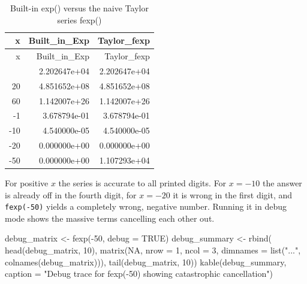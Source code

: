 \documentclass[
  letterpaper,
  DIV=11,
  numbers=noendperiod]{scrreprt}
\newenvironment{Shaded}{\begin{snugshade}}{\end{snugshade}}
\newcommand{\AttributeTok}[1]{\textcolor[rgb]{0.40,0.45,0.13}{#1}}
\newcommand{\ConstantTok}[1]{\textcolor[rgb]{0.56,0.35,0.01}{#1}}
\newcommand{\DecValTok}[1]{\textcolor[rgb]{0.68,0.00,0.00}{#1}}
\newcommand{\FunctionTok}[1]{\textcolor[rgb]{0.28,0.35,0.67}{#1}}
\newcommand{\NormalTok}[1]{\textcolor[rgb]{0.00,0.23,0.31}{#1}}
\newcommand{\OtherTok}[1]{\textcolor[rgb]{0.00,0.23,0.31}{#1}}
\newcommand{\SpecialCharTok}[1]{\textcolor[rgb]{0.37,0.37,0.37}{#1}}
\newcommand{\StringTok}[1]{\textcolor[rgb]{0.13,0.47,0.30}{#1}}
\begin{document}
\begin{longtable}[]{@{}rrr@{}}
\caption{Built-in exp() versus the naive Taylor series
fexp()}\tabularnewline
\toprule\noalign{}
x & Built\_in\_Exp & Taylor\_fexp \\
\midrule\noalign{}
\endfirsthead
\toprule\noalign{}
x & Built\_in\_Exp & Taylor\_fexp \\
\midrule\noalign{}
\endhead
\bottomrule\noalign{}
\endlastfoot
10 & 2.202647e+04 & 2.202647e+04 \\
20 & 4.851652e+08 & 4.851652e+08 \\
60 & 1.142007e+26 & 1.142007e+26 \\
-1 & 3.678794e-01 & 3.678794e-01 \\
-10 & 4.540000e-05 & 4.540000e-05 \\
-20 & 0.000000e+00 & 0.000000e+00 \\
-50 & 0.000000e+00 & 1.107293e+04 \\
\end{longtable}

For positive \(x\) the series is accurate to all printed digits. For
\(x = -10\) the answer is already off in the fourth digit, for
\(x = -20\) it is wrong in the first digit, and \texttt{fexp(-50)}
yields a completely wrong, negative number. Running it in debug mode
shows the massive terms cancelling each other out.

\begin{Shaded}
\begin{Highlighting}[]
\NormalTok{debug\_matrix }\OtherTok{\textless{}{-}} \FunctionTok{fexp}\NormalTok{(}\SpecialCharTok{{-}}\DecValTok{50}\NormalTok{, }\AttributeTok{debug =} \ConstantTok{TRUE}\NormalTok{)}
\NormalTok{debug\_summary }\OtherTok{\textless{}{-}} \FunctionTok{rbind}\NormalTok{(}
  \FunctionTok{head}\NormalTok{(debug\_matrix, }\DecValTok{10}\NormalTok{),}
  \FunctionTok{matrix}\NormalTok{(}\ConstantTok{NA}\NormalTok{, }\AttributeTok{nrow =} \DecValTok{1}\NormalTok{, }\AttributeTok{ncol =} \DecValTok{3}\NormalTok{, }\AttributeTok{dimnames =} \FunctionTok{list}\NormalTok{(}\StringTok{"..."}\NormalTok{, }\FunctionTok{colnames}\NormalTok{(debug\_matrix))),}
  \FunctionTok{tail}\NormalTok{(debug\_matrix, }\DecValTok{10}\NormalTok{))}
\FunctionTok{kable}\NormalTok{(debug\_summary, }\AttributeTok{caption =} \StringTok{"Debug trace for fexp({-}50) showing catastrophic cancellation"}\NormalTok{)}
\end{Highlighting}
\end{Shaded}
\end{document}
